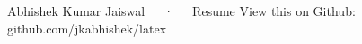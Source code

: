 \documentclass[11pt, a4paper]{awesome-cv}
\begin{document}
\makecvheader[C]

\makecvfooter
    {Abhishek Kumar Jaiswal~~~·~~~Resume}
    {\thepage}
    {View this on Github: github.com/jkabhishek/latex}






% 
% 



% 


\end{document}
